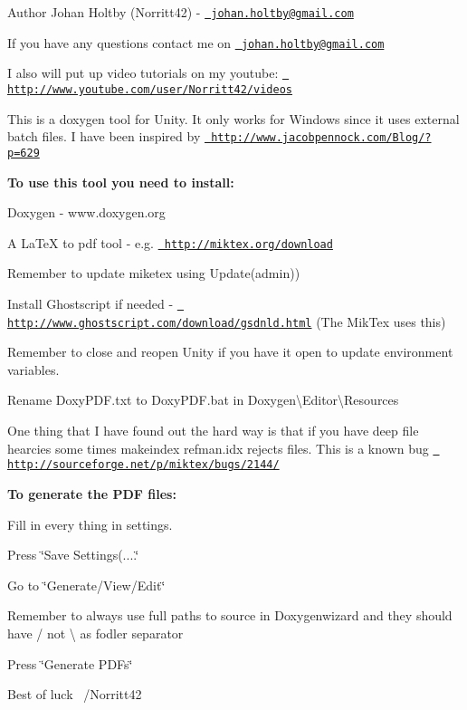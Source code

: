 \begin{DoxyAuthor}{Author}
Johan Holtby (Norritt42) -\/ \href{mailto:johan.holtby@gmail.com}{\texttt{ johan.\+holtby@gmail.\+com}}
\end{DoxyAuthor}
If you have any questions contact me on \href{mailto:johan.holtby@gmail.com}{\texttt{ johan.\+holtby@gmail.\+com}}

I also will put up video tutorials on my youtube\+: \href{http://www.youtube.com/user/Norritt42/videos}{\texttt{ http\+://www.\+youtube.\+com/user/\+Norritt42/videos}}

This is a doxygen tool for Unity. It only works for Windows since it uses external batch files. I have been inspired by \href{http://www.jacobpennock.com/Blog/?p=629}{\texttt{ http\+://www.\+jacobpennock.\+com/\+Blog/?p=629}}

{\bfseries{To use this tool you need to install\+:}} 
\begin{DoxyEnumerate}
\item Doxygen -\/ www.\+doxygen.\+org 
\item A La\+TeX to pdf tool -\/ e.\+g. \href{http://miktex.org/download}{\texttt{ http\+://miktex.\+org/download}}  
\item Remember to update miketex using Update(admin))  
\item Install Ghostscript if needed -\/ \href{http://www.ghostscript.com/download/gsdnld.html}{\texttt{ http\+://www.\+ghostscript.\+com/download/gsdnld.\+html}} (The Mik\+Tex uses this) 
\item Remember to close and reopen Unity if you have it open to update environment variables. 
\item Rename Doxy\+PDF.\+txt to Doxy\+PDF.\+bat in Doxygen\textbackslash{}\+Editor\textbackslash{}\+Resources 
\end{DoxyEnumerate}

One thing that I have found out the hard way is that if you have deep file hearcies some times makeindex refman.\+idx rejects files. This is a known bug \href{http://sourceforge.net/p/miktex/bugs/2144/}{\texttt{ http\+://sourceforge.\+net/p/miktex/bugs/2144/}}

{\bfseries{To generate the PDF files\+:}} 
\begin{DoxyEnumerate}
\item Fill in every thing in settings. 
\item Press \char`\"{}\+Save Settings(....\char`\"{} 
\item Go to \char`\"{}\+Generate/\+View/\+Edit\char`\"{} 
\item Remember to always use full paths to source in Doxygenwizard and they should have / not \textbackslash{} as fodler separator 
\item Press \char`\"{}\+Generate PDFs\char`\"{} 
\end{DoxyEnumerate}

Best of luck~\newline
/\+Norritt42 